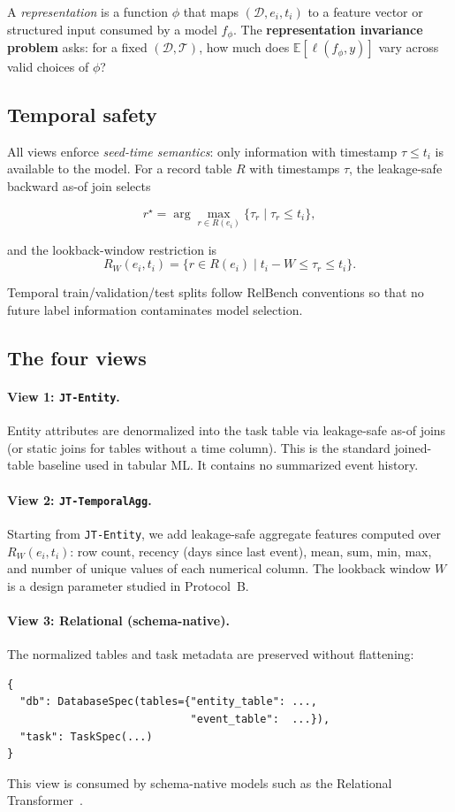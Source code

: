 \documentclass[11pt]{article}
\newcommand{\viewname}[1]{\texttt{#1}}
\begin{document}
A \emph{representation} is a function $\phi$ that maps
$(\mathcal{D}, e_i, t_i)$ to a feature vector or structured input
consumed by a model $f_\phi$.
The \textbf{representation invariance problem} asks: for a fixed
$(\mathcal{D}, \mathcal{T})$, how much does
$\mathbb{E}[\ell(f_\phi, y)]$ vary across valid choices of $\phi$?

\subsection{Temporal safety}

All views enforce \emph{seed-time semantics}: only information with
timestamp $\tau \le t_i$ is available to the model.
For a record table $R$ with timestamps $\tau$, the leakage-safe
backward as-of join selects

\[
  r^\star = \arg\max_{r \in R(e_i)} \{\tau_r \mid \tau_r \le t_i\},
\]

and the lookback-window restriction is
\[
  R_W(e_i, t_i) = \{r \in R(e_i) \mid t_i - W \le \tau_r \le t_i\}.
\]

Temporal train/validation/test splits follow RelBench conventions
so that no future label information contaminates model selection.

\subsection{The four views}
\label{sec:views}

\paragraph{View 1: \viewname{JT-Entity}.}
Entity attributes are denormalized into the task table via leakage-safe
as-of joins (or static joins for tables without a time column).
This is the standard joined-table baseline used in tabular ML.
It contains no summarized event history.

\paragraph{View 2: \viewname{JT-TemporalAgg}.}
Starting from \viewname{JT-Entity}, we add leakage-safe aggregate
features computed over $R_W(e_i, t_i)$: row count, recency (days since
last event), mean, sum, min, max, and number of unique values of each
numerical column.
The lookback window $W$ is a design parameter studied in Protocol~B.

\paragraph{View 3: Relational (schema-native).}
The normalized tables and task metadata are preserved without
flattening:
\begin{lstlisting}
{
  "db": DatabaseSpec(tables={"entity_table": ...,
                             "event_table":  ...}),
  "task": TaskSpec(...)
}
\end{lstlisting}
This view is consumed by schema-native models such as the Relational
Transformer~\citep{rt}.
\end{document}
